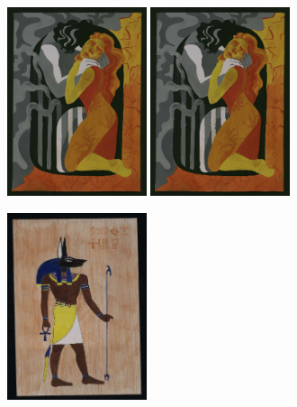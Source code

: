\begin{figure}
     \hfil
     \begin{subfigure}[b]{0.5\textwidth}
         \centering
         \includegraphics[width=0.45\textwidth]{images/style_augments/2020_14-17_2051_UKR_R_C.jpg}\hfil
         \includegraphics[width=0.45\textwidth]{images/style_augments/2020_14-17_2051_UKR_R_C_oil.jpg}
         \caption{}
     \end{subfigure}
     \hfil
     \begin{subfigure}[b]{0.5\textwidth}
         \centering
         \includegraphics[width=0.45\textwidth]{images/style_augments/2019_14-17_0188_RUS_R_C.jpg}\hfil

\end{subfigure}
\end{figure}
